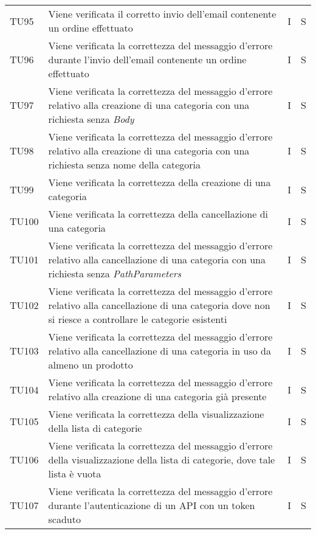 {\begin{longtable}{C{2cm} C{9.6cm} C{1.5cm} C{1cm}}
TU95 & Viene verificata il corretto invio dell'email contenente un ordine effettuato   & I & S\\

TU96 & Viene verificata la correttezza del messaggio d'errore durante l'invio dell'email contenente un ordine effettuato   & I & S\\ 

TU97 & Viene verificata la correttezza del messaggio d'errore relativo alla creazione di una categoria con una richiesta senza \textit{Body} & I & S\\ 

TU98 & Viene verificata la correttezza del messaggio d'errore relativo alla creazione di una categoria con una richiesta senza nome della categoria & I & S\\ 

TU99 & Viene verificata la correttezza della creazione di una categoria & I & S\\ 

TU100 & Viene verificata la correttezza della cancellazione di una categoria & I & S\\ 

TU101 & Viene verificata la correttezza del messaggio d'errore relativo alla cancellazione di una categoria con una richiesta senza \textit{PathParameters} & I & S\\

TU102 & Viene verificata la correttezza del messaggio d'errore relativo alla cancellazione di una categoria dove non si riesce a controllare le categorie esistenti & I & S\\

TU103 & Viene verificata la correttezza del messaggio d'errore relativo alla cancellazione di una categoria in uso da almeno un prodotto & I & S\\

TU104 & Viene verificata la correttezza del messaggio d'errore relativo alla creazione di una categoria già presente & I & S\\

TU105 & Viene verificata la correttezza della visualizzazione della lista di categorie & I & S\\

TU106 & Viene verificata la correttezza del messaggio d'errore della visualizzazione della lista di categorie, dove tale lista è vuota & I & S\\

TU107 & Viene verificata la correttezza del messaggio d'errore durante l'autenticazione di un API con un token scaduto & I & S\\


\end{longtable}}

